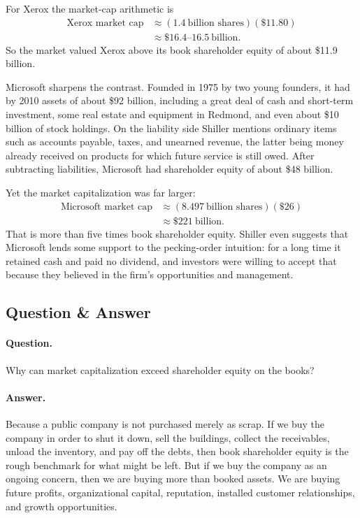 For Xerox the market-cap arithmetic is
\begin{align}
\text{Xerox market cap}
&\approx (1.4\ \text{billion shares})(\$11.80) \\
&\approx \$16.4\text{--}16.5\ \text{billion}.
\end{align}
So the market valued Xerox above its book shareholder equity of about \$11.9 billion.

Microsoft sharpens the contrast. Founded in 1975 by two young founders, it had by 2010 assets of about \$92 billion, including a great deal of cash and short-term investment, some real estate and equipment in Redmond, and even about \$10 billion of stock holdings. On the liability side Shiller mentions ordinary items such as accounts payable, taxes, and unearned revenue, the latter being money already received on products for which future service is still owed. After subtracting liabilities, Microsoft had shareholder equity of about \$48 billion.

Yet the market capitalization was far larger:
\begin{align}
\text{Microsoft market cap}
&\approx (8.497\ \text{billion shares})(\$26) \\
&\approx \$221\ \text{billion}.
\end{align}
That is more than five times book shareholder equity. Shiller even suggests that Microsoft lends some support to the pecking-order intuition: for a long time it retained cash and paid no dividend, and investors were willing to accept that because they believed in the firm's opportunities and management.

\subsection{Question \& Answer}

\paragraph{Question.} Why can market capitalization exceed shareholder equity on the books?

\paragraph{Answer.} Because a public company is not purchased merely as scrap. If we buy the company in order to shut it down, sell the buildings, collect the receivables, unload the inventory, and pay off the debts, then book shareholder equity is the rough benchmark for what might be left. But if we buy the company as an ongoing concern, then we are buying more than booked assets. We are buying future profits, organizational capital, reputation, installed customer relationships, and growth opportunities.

